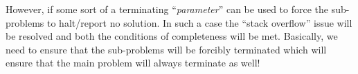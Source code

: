 \documentclass[10pt, letter]{article}
\begin{document}
However, if some sort of a terminating ``\textit{parameter}'' can be used to force the sub-problems to halt/report no solution. In such a case the ``stack overflow'' issue will be resolved and both the conditions of completeness will be met. Basically, we need to ensure that the sub-problems will be forcibly terminated which will ensure that the main problem will always terminate as well!




\end{document}
